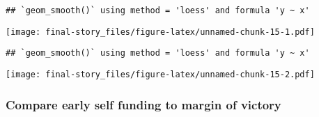 \documentclass[
]{article}
\newenvironment{Shaded}{\begin{snugshade}}{\end{snugshade}}
\newcommand{\DataTypeTok}[1]{\textcolor[rgb]{0.13,0.29,0.53}{#1}}
\newcommand{\DecValTok}[1]{\textcolor[rgb]{0.00,0.00,0.81}{#1}}
\newcommand{\KeywordTok}[1]{\textcolor[rgb]{0.13,0.29,0.53}{\textbf{#1}}}
\newcommand{\NormalTok}[1]{#1}
\newcommand{\OperatorTok}[1]{\textcolor[rgb]{0.81,0.36,0.00}{\textbf{#1}}}
\newcommand{\StringTok}[1]{\textcolor[rgb]{0.31,0.60,0.02}{#1}}
\begin{document}
\begin{verbatim}
## `geom_smooth()` using method = 'loess' and formula 'y ~ x'
\end{verbatim}

\texttt{[image: final-story\_files/figure-latex/unnamed-chunk-15-1.pdf]}

\begin{Shaded}
\end{Shaded}

\begin{verbatim}
## `geom_smooth()` using method = 'loess' and formula 'y ~ x'
\end{verbatim}

\texttt{[image: final-story\_files/figure-latex/unnamed-chunk-15-2.pdf]}

\hypertarget{compare-early-self-funding-to-margin-of-victory}{%
\subsubsection{Compare early self funding to margin of
victory}\label{compare-early-self-funding-to-margin-of-victory}}
\end{document}
